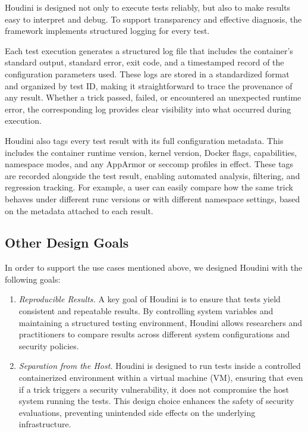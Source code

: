 \documentclass[12pt]{report}
\begin{document}
\begin{doublespace}
Houdini is designed not only to execute tests reliably, but also to make results easy to interpret and debug. To support transparency and effective diagnosis, the framework implements structured logging for every test.

Each test execution generates a structured log file that includes the container's standard output, standard error, exit code, and a timestamped record of the configuration parameters used. These logs are stored in a standardized format and organized by test ID, making it straightforward to trace the provenance of any result. Whether a trick passed, failed, or encountered an unexpected runtime error, the corresponding log provides clear visibility into what occurred during execution.

Houdini also tags every test result with its full configuration metadata. This includes the container runtime version, kernel version, Docker flags, capabilities, namespace modes, and any AppArmor or seccomp profiles in effect. These tags are recorded alongside the test result, enabling automated analysis, filtering, and regression tracking. For example, a user can easily compare how the same trick behaves under different runc versions or with different namespace settings, based on the metadata attached to each result.


\subsection{Other Design Goals}
In order to support the use cases mentioned above, we designed Houdini with the following goals:

\begin{enumerate}
  \item \label{dg:repro}\textit{Reproducible Results.} A key goal of Houdini is to ensure that tests yield consistent and repeatable results. By controlling system variables and maintaining a structured testing environment, Houdini allows researchers and practitioners to compare results across different system configurations and security policies.

  \item \label{dg:container}\textit{Separation from the Host.} Houdini is designed to run tests inside a controlled containerized environment within a virtual machine (VM), ensuring that even if a trick triggers a security vulnerability, it does not compromise the host system running the tests. This design choice enhances the safety of security evaluations, preventing unintended side effects on the underlying infrastructure.


\end{enumerate}
\end{doublespace}
\end{document}
